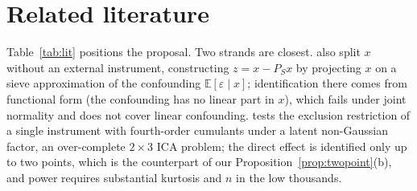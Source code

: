 \documentclass[11pt]{article}
\theoremstyle{definition}
\theoremstyle{remark}
\newcommand{\E}{\mathbb{E}}
\begin{document}
\section{Related literature}\label{sec:lit}

Table~\ref{tab:lit} positions the proposal. Two strands are closest. \citet{dong2026sp} also split
$x$ without an external instrument, constructing $z = x - P_S x$ by projecting $x$ on a sieve
approximation of the confounding $\E[\varepsilon\mid x]$; identification there comes from functional
form (the confounding has no linear part in $x$), which fails under joint normality and does not
cover linear confounding. \citet{delbianco2026} tests the exclusion restriction of a single
instrument with fourth-order cumulants under a latent non-Gaussian factor, an over-complete
$2\times3$ ICA problem; the direct effect is identified only up to two points, which is the
counterpart of our Proposition~\ref{prop:twopoint}(b), and power requires substantial kurtosis and
$n$ in the low thousands.
\end{document}
